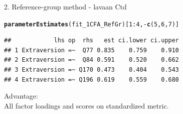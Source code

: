 \documentclass[10pt]{beamer}\usepackage[]{graphicx}\usepackage[]{xcolor}
\makeatletter
\newcommand{\hlnum}[1]{\textcolor[rgb]{0.686,0.059,0.569}{#1}}%
\newcommand{\hlopt}[1]{\textcolor[rgb]{0,0,0}{#1}}%
\newcommand{\hlstd}[1]{\textcolor[rgb]{0.345,0.345,0.345}{#1}}%
\newcommand{\hlkwd}[1]{\textcolor[rgb]{0.737,0.353,0.396}{\textbf{#1}}}%
\newenvironment{kframe}{%
 \def\at@end@of@kframe{}%
 \ifinner\ifhmode%
  \def\at@end@of@kframe{\end{minipage}}%
  \begin{minipage}{\columnwidth}%
 \fi\fi%
 \def\FrameCommand##1{\hskip\@totalleftmargin \hskip-\fboxsep
 \colorbox{shadecolor}{##1}\hskip-\fboxsep
     \hskip-\linewidth \hskip-\@totalleftmargin \hskip\columnwidth}%
 \MakeFramed {\advance\hsize-\width
   \@totalleftmargin\z@ \linewidth\hsize
   \@setminipage}}%
 {\par\unskip\endMakeFramed%
 \at@end@of@kframe}
\newenvironment{knitrout}{}{} %
\makeatother
\begin{document}
\begin{frame}[fragile]{2. Reference-group method - lavaan Ctd}

\begin{knitrout}
\color{fgcolor}\begin{kframe}
\begin{alltt}
\hlkwd{parameterEstimates}\hlstd{(fit_1CFA_RefGr)[}\hlnum{1}\hlopt{:}\hlnum{4}\hlstd{,}\hlopt{-}\hlkwd{c}\hlstd{(}\hlnum{5}\hlstd{,}\hlnum{6}\hlstd{,}\hlnum{7}\hlstd{)]}
\end{alltt}
\begin{verbatim}
##            lhs op  rhs   est ci.lower ci.upper
## 1 Extraversion =~  Q77 0.835    0.759    0.910
## 2 Extraversion =~  Q84 0.591    0.520    0.662
## 3 Extraversion =~ Q170 0.473    0.404    0.543
## 4 Extraversion =~ Q196 0.619    0.559    0.680
\end{verbatim}
\end{kframe}
\end{knitrout}

Advantage:\\ 
All factor loadings and scores on standardized metric. 

\end{frame}
%
\end{document}
